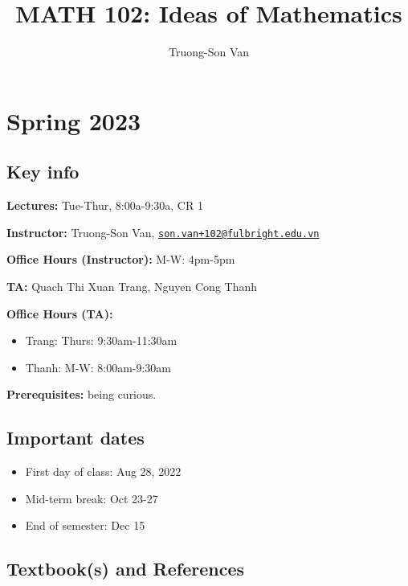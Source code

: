 \documentclass[
]{article}
\title{MATH 102: Ideas of Mathematics}
\author{Truong-Son Van}
\date{}
\providecommand{\tightlist}{%
  \setlength{\itemsep}{0pt}\setlength{\parskip}{0pt}}
\begin{document}
\maketitle

{
\setcounter{tocdepth}{2}
\tableofcontents
}
\hypertarget{spring-2023}{%
\section*{Spring 2023}\label{spring-2023}}

\hypertarget{key-info}{%
\subsection*{Key info}\label{key-info}}

\textbf{Lectures:} Tue-Thur, 8:00a-9:30a, CR 1

\textbf{Instructor:} Truong-Son Van, \href{mailto:son.van+102@fulbright.edu.vn}{\nolinkurl{son.van+102@fulbright.edu.vn}}

\textbf{Office Hours (Instructor):} M-W: 4pm-5pm

\textbf{TA:} Quach Thi Xuan Trang, Nguyen Cong Thanh

\textbf{Office Hours (TA):}

\begin{itemize}
\tightlist
\item
  Trang: Thurs: 9:30am-11:30am
\item
  Thanh: M-W: 8:00am-9:30am
\end{itemize}

\textbf{Prerequisites:} being curious.

\hypertarget{important-dates}{%
\subsection*{Important dates}\label{important-dates}}

\begin{itemize}
\tightlist
\item
  First day of class: Aug 28, 2022
\item
  Mid-term break: Oct 23-27
\item
  End of semester: Dec 15
\end{itemize}

\hypertarget{textbooks-and-references}{%
\subsection*{Textbook(s) and References}\label{textbooks-and-references}}
\end{document}

